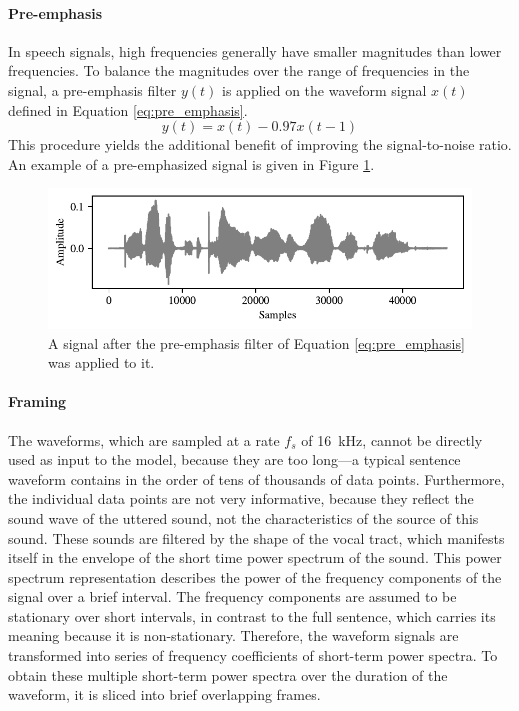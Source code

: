 		\paragraph{Pre-emphasis}

			In speech signals, high frequencies generally have smaller magnitudes than lower frequencies.
			To balance the magnitudes over the range of frequencies in the signal, a pre-emphasis filter $y(t)$ is applied on the waveform signal $x(t)$ defined in Equation \ref{eq:pre_emphasis}.
			\begin{equation}\label{eq:pre_emphasis}
				y(t) = x(t) - 0.97x(t-1)
			\end{equation}
			This procedure yields the additional benefit of improving the signal-to-noise ratio.
			An example of a pre-emphasized signal is given in Figure \ref{fig:signalemph}.
			\begin{figure}[ht]
				\centering
			    \includegraphics[width=\linewidth]{gfx/signalemph}
			    \caption[Pre-emphasis filtered signal]{A signal after the pre-emphasis filter of Equation \ref{eq:pre_emphasis} was applied to it.}
			    \label{fig:signalemph}
			\end{figure}

		\paragraph{Framing}
			The waveforms, which are sampled at a rate $f_s$ of \SI{16}{\kHz}, cannot be directly used as input to the model, because they are too long---a typical sentence waveform contains in the order of tens of thousands of data points.
			Furthermore, the individual data points are not very informative, because they reflect the sound wave of the uttered sound, not the characteristics of the source of this sound.
			These sounds are filtered by the shape of the vocal tract, which manifests itself in the envelope of the short time power spectrum of the sound.
			This power spectrum representation describes the power of the frequency components of the signal over a brief interval.
			The frequency components are assumed to be stationary over short intervals, in contrast to the full sentence, which carries its meaning because it is non-stationary.
			Therefore, the waveform signals are transformed into series of frequency coefficients of short-term power spectra.
			To obtain these multiple short-term power spectra over the duration of the waveform, it is sliced into brief overlapping frames.

